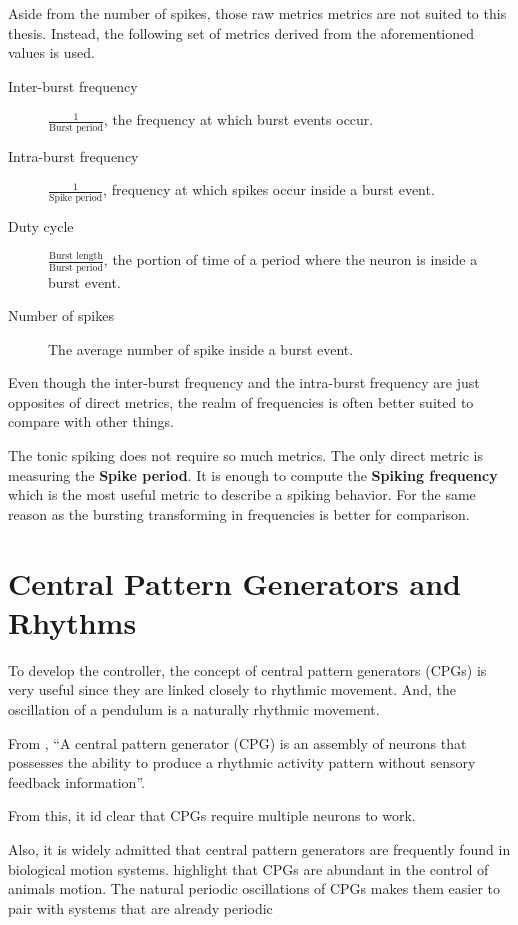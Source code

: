 Aside from the number of spikes, those raw metrics metrics are not suited to this thesis. 
Instead, the following set of metrics derived from the aforementioned values is used.
\begin{description}
    \item[Inter-burst frequency] $\frac{1}{\text{Burst period}}$, the frequency at which burst events occur.
    \item[Intra-burst frequency] $\frac{1}{\text{Spike period}}$, frequency at which spikes occur inside a burst event.
    \item[Duty cycle] $\frac{\text{Burst length}}{\text{Burst period}}$, the portion of time of a period where the neuron is inside a burst event.
    \item[Number of spikes] The average number of spike inside a burst event.
\end{description}
Even though the inter-burst frequency and the intra-burst frequency are just opposites of direct metrics, the realm of frequencies is often better suited to compare with other things.


The tonic spiking does not require so much metrics. 
The only direct metric is measuring the \textbf{Spike period}.
It is enough to compute the \textbf{Spiking frequency} which is the most useful metric to describe a spiking behavior. 
For the same reason as the bursting transforming in frequencies is better for comparison.



\section{Central Pattern Generators and Rhythms}

To develop the controller, the concept of central pattern generators (CPGs) is very useful since they are linked closely to rhythmic movement. 
And, the oscillation of a pendulum is a naturally rhythmic movement.

From \citet{cpgDef}, \enquote{A central pattern generator (CPG) is an assembly of neurons that possesses the ability to produce a rhythmic activity pattern without  sensory feedback information}.

From this, it id clear that CPGs require multiple neurons to work.

Also, it is widely admitted that central pattern generators are frequently found in biological motion systems. 
\citet{cpgMotion, cpgMotion2} highlight that CPGs are abundant in the control of animals motion.
The natural periodic oscillations of CPGs makes them easier to pair with systems that are already periodic

